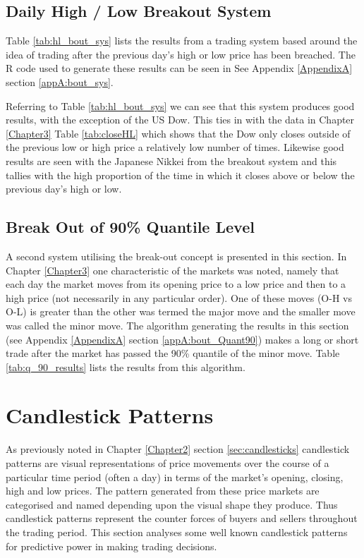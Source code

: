 \subsection{Daily High / Low Breakout System}
\label{sec:chp5:bout_sys}
Table \ref{tab:hl_bout_sys} lists the results from a trading system based around the idea of trading after the previous day's high or low price has been breached. The R code used to generate these results can be seen in See Appendix \ref{AppendixA} section \ref{appA:bout_sys}.



Referring to Table \ref{tab:hl_bout_sys} we can see that this system produces good results, with the exception of the US Dow. This ties in with the data in Chapter \ref{Chapter3} Table \ref{tab:closeHL} which shows that the Dow only closes outside of the previous low or high price a relatively low number of times. Likewise good results are seen with the Japanese Nikkei from the breakout system and this tallies with the high proportion of the time in which it closes above or below the previous day's high or low.

\subsection{Break Out of 90\% Quantile Level}
A second system utilising the break-out concept is presented in this section. In Chapter \ref{Chapter3} one characteristic of the markets was noted, namely that each day the market moves from its opening price to a low price and then to a high price (not necessarily in any particular order). One of these moves (O-H vs O-L) is greater than the other was termed the major move and the smaller move was called the minor move. The algorithm generating the results in this section (see Appendix \ref{AppendixA} section \ref{appA:bout_Quant90}) makes a long or short trade after the market has passed the 90\% quantile of the minor move. Table \ref{tab:q_90_results} lists the results from this algorithm.



\section{Candlestick Patterns}
As previously noted in Chapter \ref{Chapter2} section \ref{sec:candlesticks} candlestick patterns are visual representations of price movements over the course of a particular time period (often a day) in terms of the market's opening, closing, high and low prices. The pattern generated from these price markets are categorised and named depending upon the visual shape they produce. Thus candlestick patterns represent the counter forces of buyers and sellers throughout the trading period. This section analyses some well known candlestick patterns for predictive power in making trading decisions.

